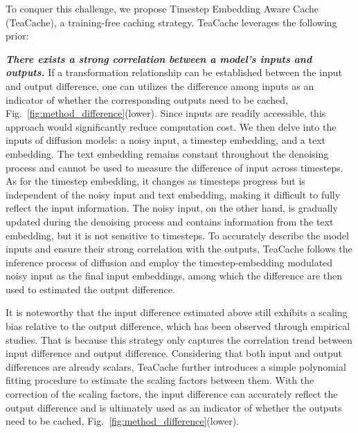 To conquer this challenge, we propose Timestep Embedding Aware Cache (TeaCache), a training-free caching strategy. TeaCache leverages the following prior: {\textbf{\textit{There exists a strong correlation between a model's inputs and outputs.}} If a transformation relationship can be established between the input and output difference, one can utilizes the difference among inputs as an indicator of whether the corresponding outputs need to be cached, Fig.~\ref{fig:method_difference}(lower). 
%
Since inputs are readily accessible, this approach would significantly reduce computation cost.
%
We then delve into the inputs of diffusion models: a noisy input, a timestep embedding, and a text embedding. The text embedding remains constant throughout the denoising process and cannot be used to measure the difference of input across timesteps.
%
As for the timestep embedding, it changes as timesteps progress but is independent of the noisy input and text embedding, making it difficult to fully reflect the input information. 
%
The noisy input, on the other hand, is gradually updated during the denoising process and contains information from the text embedding, but it is not sensitive to timesteps. 
%
To accurately describe the model inputs and ensure their strong correlation with the outputs, TeaCache follows the inference process of diffusion and employ the timestep-embedding modulated noisy input
as the final input embeddings, among which the difference are then used to estimated the output difference. 


It is noteworthy that the input difference estimated above still exhibits a scaling bias relative to the output difference, which has been observed through empirical studies. That is because this strategy only captures the correlation trend between input difference and output difference. Considering that both input and output differences are already scalars, TeaCache further introduces a simple polynomial fitting procedure to estimate the scaling factors between them. 
%
With the correction of the scaling factors, the input difference can accurately reflect the output difference and is ultimately used as an indicator of whether the outputs need to be cached, Fig.~\ref{fig:method_difference}(lower).


}

